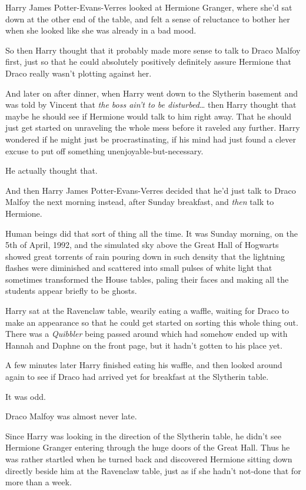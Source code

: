 Harry James Potter-Evans-Verres looked at Hermione Granger, where she'd sat 
down at the other end of the table, and felt a sense of reluctance to bother 
her when she looked like she was already in a bad mood.

So then Harry thought that it probably made more sense to talk to Draco Malfoy 
first, just so that he could absolutely positively definitely assure Hermione 
that Draco really wasn't plotting against her.

And later on after dinner, when Harry went down to the Slytherin basement and 
was told by Vincent that \emph{the boss ain't to be disturbed}{\ldots} then 
Harry thought that maybe he should see if Hermione would talk to him right 
away. That he should just get started on unraveling the whole mess before it 
raveled any further. Harry wondered if he might just be procrastinating, if his 
mind had just found a clever excuse to put off something 
unenjoyable-but-necessary.

He actually thought that.

And then Harry James Potter-Evans-Verres decided that he'd just talk to Draco 
Malfoy the next morning instead, after Sunday breakfast, and \emph{then} talk 
to Hermione.

Human beings did that sort of thing all the time.
\sbreak
It was Sunday morning, on the 5th of April, 1992, and the simulated sky above 
the Great Hall of Hogwarts showed great torrents of rain pouring down in such 
density that the lightning flashes were diminished and scattered into small 
pulses of white light that sometimes transformed the House tables, paling their 
faces and making all the students appear briefly to be ghosts.

Harry sat at the Ravenclaw table, wearily eating a waffle, waiting for Draco to 
make an appearance so that he could get started on sorting this whole thing 
out. There was a \emph{Quibbler} being passed around which had somehow ended up 
with Hannah and Daphne on the front page, but it hadn't gotten to his place yet.

A few minutes later Harry finished eating his waffle, and then looked around 
again to see if Draco had arrived yet for breakfast at the Slytherin table.

It was odd.

Draco Malfoy was almost never late.

Since Harry was looking in the direction of the Slytherin table, he didn't see 
Hermione Granger entering through the huge doors of the Great Hall. Thus he was 
rather startled when he turned back and discovered Hermione sitting down 
directly beside him at the Ravenclaw table, just as if she hadn't not-done that 
for more than a week.

